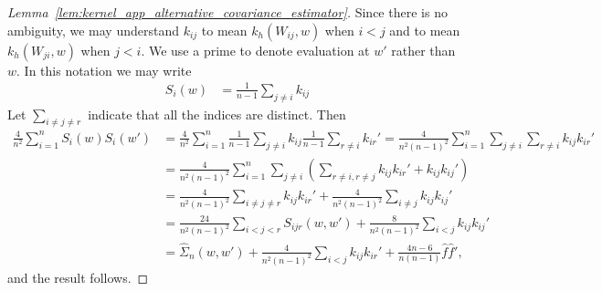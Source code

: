 \begin{proof}[Lemma~\ref{lem:kernel_app_alternative_covariance_estimator}]

  Since there is no ambiguity,
  we may understand
  $k_{i j}$
  to mean $k_h(W_{i j},w)$
  when $i<j$
  and
  to mean $k_h(W_{j i},w)$
  when $j<i$.
  We use a prime
  to denote evaluation at $w'$
  rather than $w$.
  In this notation we may write
  \begin{align*}
    S_i(w)
    &=
    \frac{1}{n-1}
    \sum_{j \neq i}
    k_{i j}
  \end{align*}
  Let $\sum_{i \neq j \neq r}$
  indicate that all the indices are distinct.
  Then
  \begin{align*}
    \frac{4}{n^2}
    \sum_{i=1}^n
    S_i(w) S_i(w')
    &=
    \frac{4}{n^2}
    \sum_{i=1}^n
    \frac{1}{n-1}
    \sum_{j \neq i}
    k_{i j}
    \frac{1}{n-1}
    \sum_{r \neq i}
    k_{i r}'
    =
    \frac{4}{n^2(n-1)^2}
    \sum_{i=1}^n
    \sum_{j \neq i}
    \sum_{r \neq i}
    k_{i j}
    k_{i r}' \\
    &=
    \frac{4}{n^2(n-1)^2}
    \sum_{i=1}^n
    \sum_{j \neq i}
    \left(
      \sum_{r \neq i, r \neq j}
      k_{i j}
      k_{i r}'
      + k_{i j}
      k_{i j}'
    \right) \\
    &=
    \frac{4}{n^2(n-1)^2}
    \sum_{i \neq j \neq r}
    k_{i j}
    k_{i r}'
    + \frac{4}{n^2(n-1)^2}
    \sum_{i \neq j}
    k_{i j}
    k_{i j}' \\
    &=
    \frac{24}{n^2(n-1)^2}
    \sum_{i < j < r}
    S_{i j r}(w,w')
    + \frac{8}{n^2(n-1)^2}
    \sum_{i < j}
    k_{i j}
    k_{i j}' \\
    &=
    \hat \Sigma_n(w,w')
    + \frac{4}{n^2(n-1)^2}
    \sum_{i < j}
    k_{i j}
    k_{i r}'
    + \frac{4n-6}{n(n-1)}
    \hat f
    \hat f',
  \end{align*}
  and the result follows.
\end{proof}

